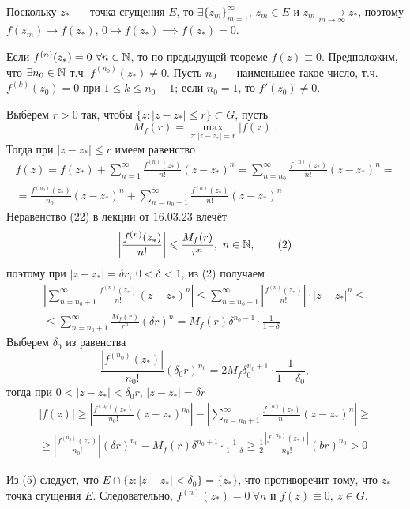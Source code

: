 \documentclass[main]{subfiles}
\begin{document}
\begin{longProof}
    Поскольку $z_*$~--- точка сгущения $E$, то $\exists \{z_m\}_{m = 1}^\infty$, $z_m \in E$ и $z_m \xrightarrow[m\to\infty]{} z_*$, поэтому $f(z_m) \to f(z_*)$, $0\to f(z_*) \implies f(z_*) = 0$.

    Если $f^{(n)}(z_*) = 0\ \forall n \in \mathbb{N}$, то по предыдущей теореме $f(z) \equiv 0$.
    Предположим, что $\exists n_0 \in \mathbb{N}$ т.ч. $f^{(n_0)}(z_*) \neq 0$.
    Пусть $n_0$~--- наименьшее такое число, т.ч. $f^{(k)}(z_0) = 0$ при $1 \le  k \le n_0 - 1$; если $n_0 = 1$, то $f'(z_0) \neq 0$.

    Выберем $r > 0$ так, чтобы $\{z:|z - z_*| \le r\} \subset G$, пусть
    \[M_f(r)=\max_{z:|z-z_*|=r} |f(z)|.\]
    Тогда при $|z - z_*| \le r$ имеем равенство
    \begin{multline*}
        f(z) = f(z_*) + \sum_{n = 1}^\infty \frac{f^{(n)}(z_*)}{n!} (z-z_*)^n = \sum \limits_{n = n_0}^\infty \frac{f^{(n)} (z_*)}{n!} (z-z_*)^n = \\
        = \frac{f^{(n_0)}(z_*)}{n_0!} (z-z_*)^n + \sum_{n = n_0 + 1}^\infty \frac{f^{(n)}(z_*)}{n!} (z - z_*)^n\tag{1}
    \end{multline*}
    Неравенство (22) в лекции от $16.03.23$ влечёт %
    \[ \left| \frac{f^{(n)}(z_*)}{n!} \right| \leqslant \frac{M_f(r)}{r^n},\ n \in \mathbb{N},\tag{2} \]
    поэтому при $|z - z_*| =  \delta r$, $0 < \delta < 1$, из (2) получаем
    \begin{multline*}
        \left| \sum_{n = n_0 + 1}^\infty \frac{f^{(n)}(z_*)}{n!} (z-z_*)^n \right| \le \sum_{n = n_0 + 1}^\infty \left| \frac{f^{(n)}(z_*)}{n!} \right| \cdot |z-z_*|^n \le\\
        \le \sum_{n = n_0 + 1}^\infty \frac{M_f(r)}{r^n} (\delta r)^n = M_f(r) \delta^{n_0+1} \cdot \frac{1}{1 - \delta}\tag{3}
    \end{multline*}
    Выберем $\delta_0$ из равенства
    \[ \frac{|f^{(n_0)}(z_*)|}{n_0!} (\delta_0 r)^{n_0} = 2 M_f \delta_0^{n_0 + 1} \cdot \frac{1}{1 - \delta_0}, \tag{4} \]
    тогда при $0 < |z - z_*| < \delta_0 r$, $|z - z_*| = \delta r$
    \begin{multline*}
        |f(z)| \ge \left| \frac{f^{(n_0)}(z_*)}{n_0!} (z - z_*)^{n_0} \right| - \left|\sum_{n = n_0 + 1}^\infty \frac{f^{(n)} (z_*)}{n!} (z-z_*)^n \right| \ge                                    \\
        \ge \left| \frac{f^{(n_0)}(z_*)}{n_0!} \right| (\delta r)^{n_0} - M_f(r) \delta^{n_0 + 1} \cdot \frac{1}{1 - \delta} \ge \frac{1}{2}\frac{|f^{(n_0)}(z_*)|}{n_0!} (br)^{n_0} > 0 \tag{5}
    \end{multline*}

    Из (5) следует, что $E\cap\{z:|z-z_*|<\delta_0\}=\{z_*\}$, что противоречит тому, что $z_*$ -- точка сгущения $E$. Следовательно, $f^{(n)}(z_*)=0\ \forall n$ и $f(z)\equiv 0,\ z\in G$.
\end{longProof}
\end{document}

